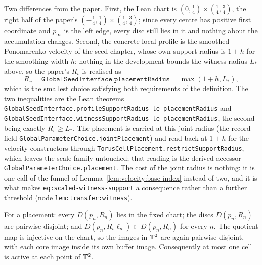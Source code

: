 Two differences from the paper.  First, the Lean chart is
$(0,\tfrac14)\times(\tfrac14,\tfrac34) $, the right half of the paper's
$(-\tfrac14,\tfrac14)\times(\tfrac14,\tfrac34) $; since every centre has positive first
coordinate and $p_\infty $ is the left edge, every disc still lies in it and nothing about
the accumulation changes.  Second, the concrete local profile is the smoothed Ponomarenko
velocity of the seed chapter, whose own support radius is $1+h $ for the smoothing width
$h $; nothing in the development bounds the witness radius $L_* $ above, so the paper's
$R_v $ is realised as
\[
  R_v=\texttt{GlobalSeedInterface.placementRadius}=\max(1+h,L_*),
\]
which is the smallest choice satisfying both requirements of the definition.  The two
inequalities are the Lean theorems
\texttt{GlobalSeedInterface.profileSupportRadius\_le\_placementRadius} and
\texttt{GlobalSeedInterface.witnessSupportRadius\_le\_placementRadius}, the second being
exactly $R_v\geq L_* $.  The placement is carried at this joint radius (the record field
\texttt{GlobalParameterChoice.jointPlacement}) and read back at $1+h $ for the velocity
constructors through \texttt{TorusCellPlacement.restrictSupportRadius}, which leaves the
scale family untouched; that reading is the derived accessor
\texttt{GlobalParameterChoice.placement}.  The cost of the joint radius is nothing: it is
one call of the funnel of Lemma~\ref{lem:velocity:base-index} instead of two, and it is what
makes \texttt{eq:scaled-witness-support} a consequence rather than a further threshold
(node \texttt{lem:transfer:witness}).

\begin{lemma}
  \label{lem:velocity:disjoint-placement}
  \leanok
  For a placement: every $D(p_n,R_n) $ lies in the fixed chart; the discs $D(p_n,R_n) $ are
  pairwise disjoint; and $D(p_n,R_v\ell_n)\subset D(p_n,R_n) $ for every $n $.  The quotient
  map is injective on the chart, so the images in $\mathbb{T}^2 $ are again pairwise disjoint, with
  each core image inside its own buffer image.  Consequently at most one cell is active at
  each point of $\mathbb{T}^2 $.
\end{lemma}

